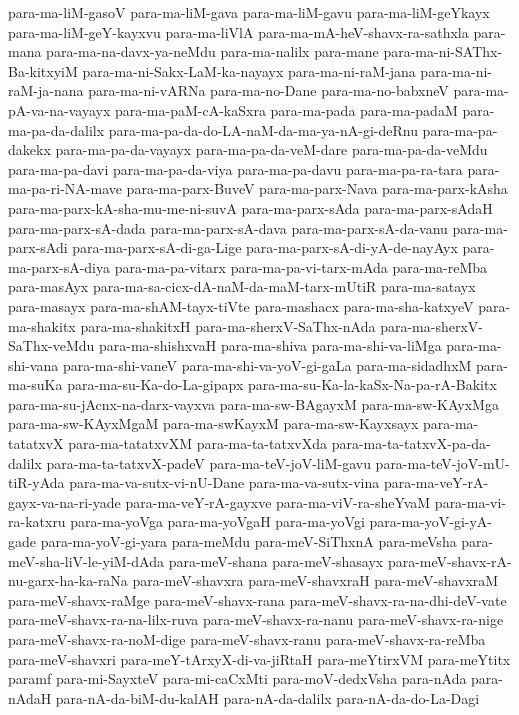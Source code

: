 {para-ma-liM-gasoV
para-ma-liM-gava
para-ma-liM-gavu
para-ma-liM-geYkayx
para-ma-liM-geY-kayxvu
para-ma-liVlA
para-ma-mA-heV-shavx-ra-sathxla
para-mana
para-ma-na-davx-ya-neMdu
para-ma-nalilx
para-mane
para-ma-ni-SAThx-Ba-kitxyiM
para-ma-ni-Sakx-LaM-ka-nayayx
para-ma-ni-raM-jana
para-ma-ni-raM-ja-nana
para-ma-ni-vARNa
para-ma-no-Dane
para-ma-no-babxneV
para-ma-pA-va-na-vayayx
para-ma-paM-cA-kaSxra
para-ma-pada
para-ma-padaM
para-ma-pa-da-dalilx
para-ma-pa-da-do-LA-naM-da-ma-ya-nA-gi-deRnu
para-ma-pa-dakekx
para-ma-pa-da-vayayx
para-ma-pa-da-veM-dare
para-ma-pa-da-veMdu
para-ma-pa-davi
para-ma-pa-da-viya
para-ma-pa-davu
para-ma-pa-ra-tara
para-ma-pa-ri-NA-mave
para-ma-parx-BuveV
para-ma-parx-Nava
para-ma-parx-kAsha
para-ma-parx-kA-sha-mu-me-ni-suvA
para-ma-parx-sAda
para-ma-parx-sAdaH
para-ma-parx-sA-dada
para-ma-parx-sA-dava
para-ma-parx-sA-da-vanu
para-ma-parx-sAdi
para-ma-parx-sA-di-ga-Lige
para-ma-parx-sA-di-yA-de-nayAyx
para-ma-parx-sA-diya
para-ma-pa-vitarx
para-ma-pa-vi-tarx-mAda
para-ma-reMba
para-masAyx
para-ma-sa-cicx-dA-naM-da-maM-tarx-mUtiR
para-ma-satayx
para-masayx
para-ma-shAM-tayx-tiVte
para-mashacx
para-ma-sha-katxyeV
para-ma-shakitx
para-ma-shakitxH
para-ma-sherxV-SaThx-nAda
para-ma-sherxV-SaThx-veMdu
para-ma-shishxvaH
para-ma-shiva
para-ma-shi-va-liMga
para-ma-shi-vana
para-ma-shi-vaneV
para-ma-shi-va-yoV-gi-gaLa
para-ma-sidadhxM
para-ma-suKa
para-ma-su-Ka-do-La-gipapx
para-ma-su-Ka-la-kaSx-Na-pa-rA-Bakitx
para-ma-su-jAcnx-na-darx-vayxva
para-ma-sw-BAgayxM
para-ma-sw-KAyxMga
para-ma-sw-KAyxMgaM
para-ma-swKayxM
para-ma-sw-Kayxsayx
para-ma-tatatxvX
para-ma-tatatxvXM
para-ma-ta-tatxvXda
para-ma-ta-tatxvX-pa-da-dalilx
para-ma-ta-tatxvX-padeV
para-ma-teV-joV-liM-gavu
para-ma-teV-joV-mU-tiR-yAda
para-ma-va-sutx-vi-nU-Dane
para-ma-va-sutx-vina
para-ma-veY-rA-gayx-va-na-ri-yade
para-ma-veY-rA-gayxve
para-ma-viV-ra-sheYvaM
para-ma-vi-ra-katxru
para-ma-yoVga
para-ma-yoVgaH
para-ma-yoVgi
para-ma-yoV-gi-yA-gade
para-ma-yoV-gi-yara
para-meMdu
para-meV-SiThxnA
para-meVsha
para-meV-sha-liV-le-yiM-dAda
para-meV-shana
para-meV-shasayx
para-meV-shavx-rA-nu-garx-ha-ka-raNa
para-meV-shavxra
para-meV-shavxraH
para-meV-shavxraM
para-meV-shavx-raMge
para-meV-shavx-rana
para-meV-shavx-ra-na-dhi-deV-vate
para-meV-shavx-ra-na-lilx-ruva
para-meV-shavx-ra-nanu
para-meV-shavx-ra-nige
para-meV-shavx-ra-noM-dige
para-meV-shavx-ranu
para-meV-shavx-ra-reMba
para-meV-shavxri
para-meY-tArxyX-di-va-jiRtaH
para-meYtirxVM
para-meYtitx
paramf
para-mi-SayxteV
para-mi-caCxMti
para-moV-dedxVsha
para-nAda
para-nAdaH
para-nA-da-biM-du-kalAH
para-nA-da-dalilx
para-nA-da-do-La-Dagi
}
